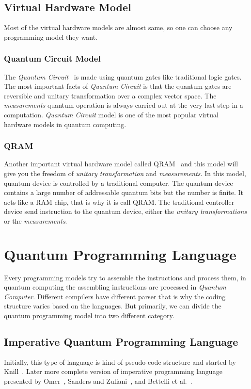 \documentclass[11pt, conference, onecolumn]{IEEEtran}
\begin{document}
\subsection{Virtual Hardware Model}
Most of the virtual hardware models are almost same, so one can choose any programming model they want.

\subsubsection{Quantum Circuit Model}
The \textit{Quantum Circuit}~\cite{yao1993quantum} is made using quantum gates like traditional logic gates. The most important facts of \textit{Quantum Circuit} is that the quantum gates 
are reversible and unitary transformation over a complex vector space. The \textit{measurements} quantum operation is always carried out at the very last step in a computation. 
\textit{Quantum Circuit} model is one of the most popular virtual hardware models in quantum computing.

\subsubsection{QRAM}
Another important virtual hardware model called QRAM~\cite{knill1996conventions} and this model will give you the freedom of  \textit{unitary transformation} and \textit{measurements}. 
In this model, quantum device is controlled by a traditional computer. The quantum device contains a large number of addressable quantum bits but the number is finite. It acts like a 
RAM chip, that is why it is call QRAM. The traditional controller device send instruction to the quantum device, either the \textit{unitary transformations} or the \textit{measurements}.

\section{Quantum Programming Language}
Every programming models try to assemble the instructions and process them, in quantum computing the assembling instructions are processed in \textit{Quantum Computer}. Different compilers 
have different parser that is why the coding structure varies based on the languages. But primarily, we can divide the quantum programming model into two different category.  

\subsection{Imperative Quantum Programming Language}
Initially, this type of language is kind of pseudo-code structure and started by Knill~\cite{knill1996conventions}. Later more complete version of imperative programming language 
presented by Omer~\cite{omer1998procedural}, Sanders and Zuliani~\cite{sanders2000quantum}, and Bettelli et al.~\cite{bettelli2003toward}.
\end{document}
